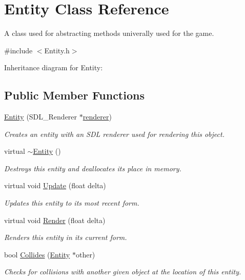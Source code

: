 \hypertarget{classEntity}{}\section{Entity Class Reference}
\label{classEntity}


A class used for abstracting methods univerally used for the game.  




{\ttfamily \#include $<$Entity.\+h$>$}



Inheritance diagram for Entity\+:
\subsection*{Public Member Functions}
\begin{DoxyCompactItemize}
\item 
\mbox{\label{classEntity_acb01d7c2e027979a2cada6fa9c943240}} 
\hyperlink{classEntity_acb01d7c2e027979a2cada6fa9c943240}{Entity} (S\+D\+L\+\_\+\+Renderer $\ast$\hyperlink{classEntity_a2747dfdd9fa4fe743c8b80450bc99dbd}{renderer})
\begin{DoxyCompactList}\small\item\em Creates an entity with an S\+DL renderer used for rendering this object. \end{DoxyCompactList}\item 
\mbox{\label{classEntity_a588098978eea6a3486b7361605ff3f0f}} 
virtual \hyperlink{classEntity_a588098978eea6a3486b7361605ff3f0f}{$\sim$\+Entity} ()
\begin{DoxyCompactList}\small\item\em Destroys this entity and deallocates its place in memory. \end{DoxyCompactList}\item 
virtual void \hyperlink{classEntity_aec10420b2cfc1b9a367d018966c620d3}{Update} (float delta)
\begin{DoxyCompactList}\small\item\em Updates this entity to its most recent form. \end{DoxyCompactList}\item 
virtual void \hyperlink{classEntity_a48b58f16934376de583771ddabcf5bdb}{Render} (float delta)
\begin{DoxyCompactList}\small\item\em Renders this entity in its current form. \end{DoxyCompactList}\item 
\mbox{\label{classEntity_aedb02f3a7501604c34cb58b796873ff8}} 
bool \hyperlink{classEntity_aedb02f3a7501604c34cb58b796873ff8}{Collides} (\hyperlink{classEntity}{Entity} $\ast$other)
\begin{DoxyCompactList}\small\item\em Checks for collisions with another given object at the location of this entity. \end{DoxyCompactList}\end{DoxyCompactItemize}
